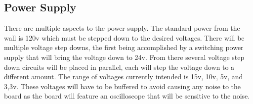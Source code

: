 \subsection{Power Supply}
	There are multiple aspects to the power supply. The standard power from the wall is 120v which must be stepped down to the desired voltages. There will be multiple voltage step downs, the first being accomplished by a switching power supply that will bring the voltage down to 24v. From there several voltage step down circuits will be placed in parallel, each will step the voltage down to a different amount. The range of voltages currently intended is 15v, 10v, 5v, and 3,3v. These voltages will have to be buffered to avoid causing any noise to the board as the board will feature an oscilloscope that will be sensitive to the noise.